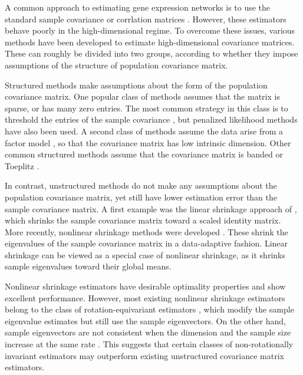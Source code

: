 \documentclass[useAMS,referee,usenatbib]{biom}
\begin{document}
A common approach to estimating gene expression networks is to use the standard sample covariance or corrlation matrices \citep{langfelder2008wgcna, zhang2005general}. However, these estimators behave poorly in the high-dimensional regime. To overcome these issues, various methods have been developed to estimate high-dimensional covariance matrices. These can roughly be divided into two groups, according to whether they impose assumptions of the structure of population covariance matrix.

Structured methods make assumptions about the form of the population covariance matrix. One popular class of methods assumes that the matrix is sparse, or has many zero entries. The most common strategy in this class is to threshold the entries of the sample covariance \citep{rothman2009generalized, cai2011adaptive}, but penalized likelihood methods \citep{xue2012positive} have also been used. A second class of methods assume the data arise from a factor model \citep{fan2008high}, so that the covariance matrix has low intrinsic dimension. Other common structured methods assume that the covariance matrix is banded \citep{li2017estimation} or Toeplitz \citep{liu2017covariance}.

In contrast, unstructured methods do not make any assumptions about the population covariance matrix, yet still have lower estimation error than the sample covariance matrix. A first example was the linear shrinkage approach of \citet{ledoit2004well}, which shrinks the sample covariance matrix toward a scaled identity matrix. More recently, nonlinear shrinkage methods were developed \citep{ledoit2012nonlinear, ledoit2019quadratic, lam2016nonparametric}. These shrink the eigenvalues of the sample covariance matrix in a data-adaptive fashion. Linear shrinkage can be viewed as a special case of nonlinear shrinkage, as it shrinks sample eigenvalues toward their global means.

Nonlinear shrinkage estimators have desirable optimality properties \citep{ledoit2018analytical} and show excellent performance. However, most existing nonlinear shrinkage estimators belong to the class of rotation-equivariant estimators \citep{bun2016rotational, stein1975estimation, stein1986lectures}, which modify the sample eigenvalue estimates but still use the sample eigenvectors. On the other hand, sample eigenvectors are not consistent when the dimension and the sample size increase at the same rate \citep{mestre2008asymptotic}. This suggests that certain classes of non-rotationally invariant estimators may outperform existing unstructured covariance matrix estimators.
\end{document}
